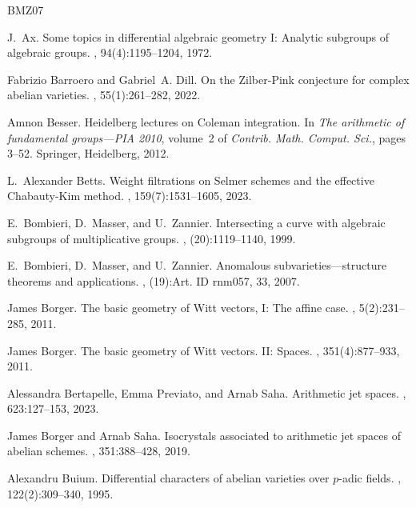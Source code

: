 \documentclass[11pt]{amsart}
\theoremstyle{plain}
\theoremstyle{definition}
\begin{document}
\begin{thebibliography}{BMZ07}

J.~Ax.
\newblock Some topics in differential algebraic geometry {I}: {A}nalytic subgroups of algebraic groups.
, 94(4):1195--1204, 1972.

Fabrizio Barroero and Gabriel~A. Dill.
\newblock On the {Z}ilber-{P}ink conjecture for complex abelian varieties.
, 55(1):261--282, 2022.

Amnon Besser.
\newblock Heidelberg lectures on {C}oleman integration.
\newblock In {\em The arithmetic of fundamental groups---{PIA} 2010}, volume~2 of {\em Contrib. Math. Comput. Sci.}, pages 3--52. Springer, Heidelberg, 2012.

L.~Alexander Betts.
\newblock Weight filtrations on {S}elmer schemes and the effective {C}habauty-{K}im method.
, 159(7):1531--1605, 2023.

E.~Bombieri, D.~Masser, and U.~Zannier.
\newblock Intersecting a curve with algebraic subgroups of multiplicative groups.
, (20):1119--1140, 1999.

E.~Bombieri, D.~Masser, and U.~Zannier.
\newblock Anomalous subvarieties---structure theorems and applications.
, (19):Art. ID rnm057, 33, 2007.

James Borger.
\newblock The basic geometry of {W}itt vectors, {I}: {T}he affine case.
, 5(2):231--285, 2011.

James Borger.
\newblock The basic geometry of {W}itt vectors. {II}: {S}paces.
, 351(4):877--933, 2011.

Alessandra Bertapelle, Emma Previato, and Arnab Saha.
\newblock Arithmetic jet spaces.
, 623:127--153, 2023.

James Borger and Arnab Saha.
\newblock Isocrystals associated to arithmetic jet spaces of abelian schemes.
, 351:388--428, 2019.

Alexandru Buium.
\newblock Differential characters of abelian varieties over {$p$}-adic fields.
, 122(2):309--340, 1995.


\end{thebibliography}
\end{document}
